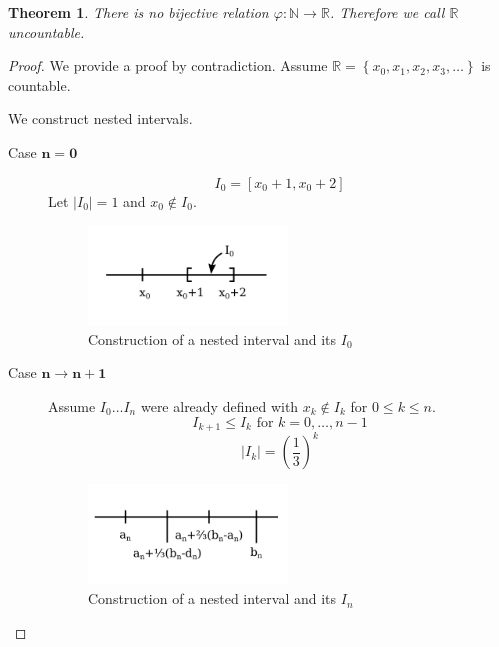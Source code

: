 \documentclass[a4paper,landscape,twocolumn]{article}
\newtheorem{theorem}{Theorem}
\newcommand\set[1]{\left\{#1\right\}}
\newcommand\abs[1]{\left|#1\right|}
\begin{document}
\begin{theorem}
  There is no bijective relation $\varphi: \mathbb N \rightarrow \mathbb R$.
  Therefore we call $\mathbb R$ \emph{uncountable}.
\end{theorem}

\begin{proof}
  We provide a proof by contradiction.
  Assume $\mathbb R = \set{x_0, x_1, x_2, x_3, \ldots}$ is countable.

  We construct nested intervals.
  \begin{description}
    \item[Case $\mathbf{n = 0}$]
      \[ I_0 = \left[x_0 + 1, x_0 + 2\right] \]
      Let $\abs{I_0} = 1$ and $x_0 \not\in I_0$.

      \begin{figure}[!t]
        \begin{center}
          \includegraphics[width=200px]{img/interval_I0.pdf}
          \caption{Construction of a nested interval and its $I_0$}
        \end{center}
      \end{figure}

    \item[Case $\mathbf{n \rightarrow n + 1}$]
      Assume $I_{0} \dots I_n$ were already defined with $x_k \notin I_k$ for $0 \leq k \leq n$.
      \[ I_{k+1} \leq I_k \text{ for } k = 0, \dots, n-1 \]
      \[ \abs{I_k} = \left(\frac13\right)^k \]

      \begin{figure}[!t]
        \begin{center}
          \includegraphics[width=200px]{img/interval_In.pdf}
          \caption{Construction of a nested interval and its $I_n$}
        \end{center}
      \end{figure}


\end{description}
\end{proof}
\end{document}
